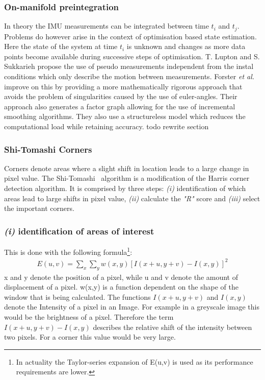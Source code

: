 \documentclass[11pt,a4paper]{article}
\begin{document}
\subsubsection{On-manifold preintegration} \label{pre:on-manifold}
In theory the IMU measurements can be integrated between time $t_i$ and $t_j$.
Problems do however arise in the context of optimisation based state estimation. 
Here the state of the system at time $t_i$ is unknown and changes as more data points become available during successive steps of optimisation.
T. Lupton and S. Sukkarieh \cite{preint_lupton} propose the use of pseudo measurements independent from the instal conditions which only describe the motion between measurements.
Forster \textit{et al.} \cite{Forster_2017} improve on this by providing a more mathematically rigorous approach that avoids the problem of singularities caused by the use of euler-angles. 
Their approach also generates a factor graph allowing for the use of incremental smoothing algorithms. 
They also use a structureless model which reduces the computational load while retaining accuracy.
todo rewrite section

\subsubsection{Shi-Tomashi Corners} \label{Sec:Shi-Tomashi}
Corners denote areas where a slight shift in location leads to a large change in pixel value. 
The Shi-Tomashi~\cite{Shi_tomasi} algorithm is a modification of the Harris corner detection algorithm. 
It is comprised by three steps: \emph{(i)} identification of which areas lead to large shifts in pixel value, \emph{(ii)} calculate the \textit{"R"} score and \emph{(iii)} select the important corners.
\subsubsection*{\emph{(i)} identification of areas of interest} 

This is done with the following formula\footnote{In actuality the Taylor-series expansion of E(u,v) is used as its performance requirements are lower.}:
\begin{align}
    E(u,v) = \sum_{x} \sum_y w(x,y) [I(x+u,y+v)- I(x,y)]^2  
\end{align}
x and y denote the position of a pixel, while u and v denote the amount of displacement of a pixel.
w(x,y) is a function dependent on the shape of the window that is being calculated. 
The functions $I(x+u,y+v)$ and $I(x,y)$ denote the Intensity of a pixel in an Image.
For example in a greyscale image this would be the brightness of a pixel.
Therefore the term $I(x+u,y+v)- I(x,y)$ describes the relative shift of the intensity between two pixels. For a corner this value would be very large.
\end{document}
